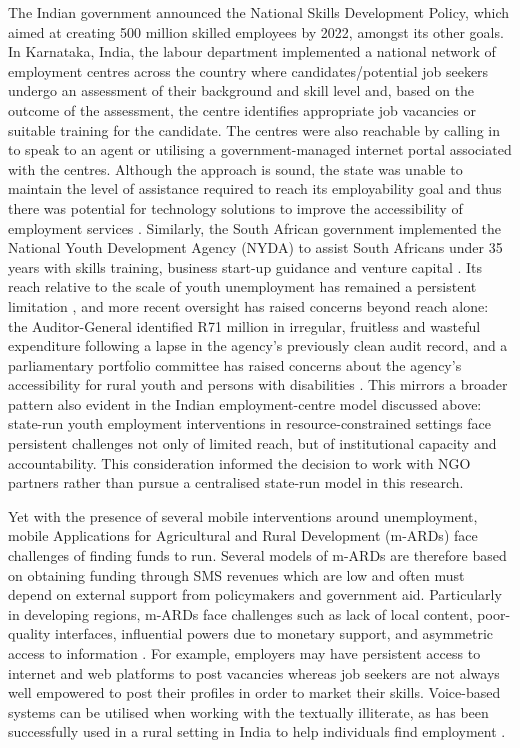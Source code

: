 The Indian government announced the National Skills Development Policy, which aimed at creating 500 million skilled employees by 2022, amongst its other goals. In Karnataka, India, the labour department implemented a national network of employment centres across the country where candidates/potential job seekers undergo an assessment of their background and skill level and, based on the outcome of the assessment, the centre identifies appropriate job vacancies or suitable training for the candidate. The centres were also reachable by calling in to speak to an agent or utilising a government-managed internet portal associated with the centres. Although the approach is sound, the state was unable to maintain the level of assistance required to reach its employability goal and thus there was potential for technology solutions to improve the accessibility of employment services \cite{white2012}. Similarly, the South African government implemented the National Youth Development Agency (NYDA) to assist South Africans under 35 years with skills training, business start-up guidance and venture capital \cite{nyda2015}. Its reach relative to the scale of youth unemployment has remained a persistent limitation \cite{statssa2015}, and more recent oversight has raised concerns beyond reach alone: the Auditor-General identified R71 million in irregular, fruitless and wasteful expenditure following a lapse in the agency's previously clean audit record, and a parliamentary portfolio committee has raised concerns about the agency's accessibility for rural youth and persons with disabilities \cite{sundaytimes2026,pmg2025nyda}. This mirrors a broader pattern also evident in the Indian employment-centre model discussed above: state-run youth employment interventions in resource-constrained settings face persistent challenges not only of limited reach, but of institutional capacity and accountability. This consideration informed the decision to work with NGO partners rather than pursue a centralised state-run model in this research.

Yet with the presence of several mobile interventions around unemployment, mobile Applications for Agricultural and Rural Development (m-ARDs) face challenges of finding funds to run. Several models of m-ARDs are therefore based on obtaining funding through SMS revenues which are low and often must depend on external support from policymakers and government aid. Particularly in developing regions, m-ARDs face challenges such as lack of local content, poor-quality interfaces, influential powers due to monetary support, and asymmetric access to information \cite{qiang2012}. For example, employers may have persistent access to internet and web platforms to post vacancies whereas job seekers are not always well empowered to post their profiles in order to market their skills. Voice-based systems can be utilised when working with the textually illiterate, as has been successfully used in a rural setting in India to help individuals find employment \cite{white2012}.

